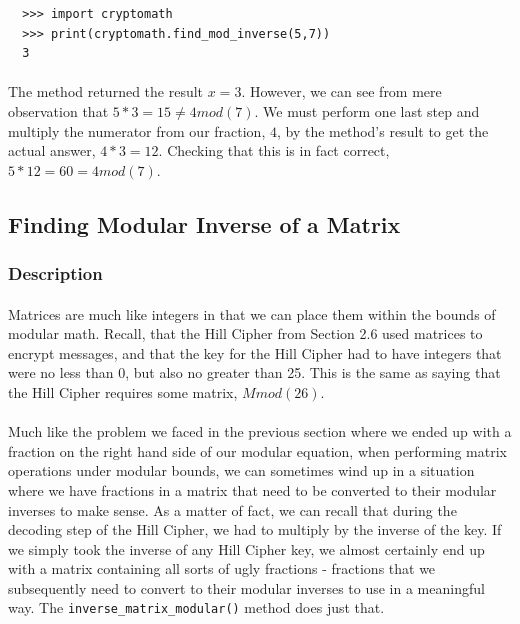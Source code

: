 \documentclass[12pt,a4paper]{article}
\begin{document}
\begin{verbatim}
  >>> import cryptomath
  >>> print(cryptomath.find_mod_inverse(5,7))
  3
\end{verbatim}

\paragraph{}
The method returned the result $x = 3$.  However, we can see from mere 
observation that $5*3 = 15 \neq 4 mod(7)$.  We must perform one last step and 
multiply the numerator from our fraction, $4$, by the method's result to get 
the actual answer, $4*3 = 12$.  Checking that this is in fact correct, 
$5*12 = 60 = 4 mod(7)$.


\subsection{Finding Modular Inverse of a Matrix}
\subsubsection{Description}
\paragraph{}
Matrices are much like integers in that we can place them within the bounds of 
modular math.  Recall, that the Hill Cipher from Section 2.6 used matrices to 
encrypt messages, and that the key for the Hill Cipher had to have integers that 
were no less than 0, but also no greater than 25.  This is the same as saying 
that the Hill Cipher requires some matrix, $M mod(26)$.

\paragraph{}
Much like the problem we faced in the previous section where we ended up with 
a fraction on the right hand side of our modular equation, when performing matrix 
operations under modular bounds, we can sometimes wind up in a situation where 
we have fractions in a matrix that need to be converted to their modular 
inverses to make sense.  As a matter of fact, we can recall that during the 
decoding step of the Hill Cipher, we had to multiply by the inverse of the key. 
If we simply took the inverse of any Hill Cipher key, we almost certainly end 
up with a matrix containing all sorts of ugly fractions - fractions that we 
subsequently need to convert to their modular inverses to use in a meaningful 
way.  The \verb|inverse_matrix_modular()| method does just that.
\end{document}

